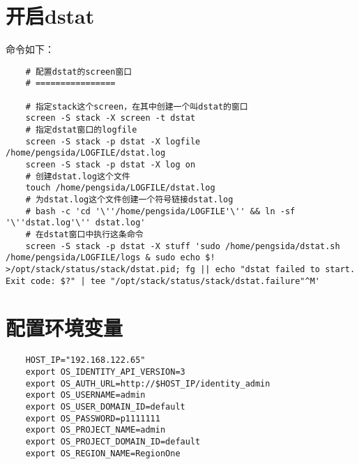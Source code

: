 \documentclass[a4paper,left=1.5cm,right=1.5cm,11pt]{article}
\begin{document}
\section{开启dstat}
	命令如下：
	\begin{lstlisting}
	# 配置dstat的screen窗口
	# ================

	# 指定stack这个screen，在其中创建一个叫dstat的窗口
	screen -S stack -X screen -t dstat
	# 指定dstat窗口的logfile
	screen -S stack -p dstat -X logfile /home/pengsida/LOGFILE/dstat.log
	screen -S stack -p dstat -X log on
	# 创建dstat.log这个文件
	touch /home/pengsida/LOGFILE/dstat.log
	# 为dstat.log这个文件创建一个符号链接dstat.log
	# bash -c 'cd '\''/home/pengsida/LOGFILE'\'' && ln -sf '\''dstat.log'\'' dstat.log'
	# 在dstat窗口中执行这条命令
	screen -S stack -p dstat -X stuff 'sudo /home/pengsida/dstat.sh /home/pengsida/LOGFILE/logs & sudo echo $! >/opt/stack/status/stack/dstat.pid; fg || echo "dstat failed to start. Exit code: $?" | tee "/opt/stack/status/stack/dstat.failure"^M'
	\end{lstlisting}

\section{配置环境变量}
	\begin{lstlisting}
	HOST_IP="192.168.122.65"
	export OS_IDENTITY_API_VERSION=3
    export OS_AUTH_URL=http://$HOST_IP/identity_admin
    export OS_USERNAME=admin
    export OS_USER_DOMAIN_ID=default
    export OS_PASSWORD=p1111111
    export OS_PROJECT_NAME=admin
    export OS_PROJECT_DOMAIN_ID=default
    export OS_REGION_NAME=RegionOne
	\end{lstlisting}
\end{document}
